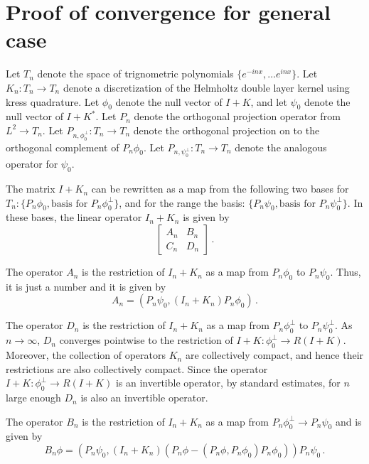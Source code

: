 \section{Proof of convergence for general case}
Let $T_{n}$ denote the space of trignometric polynomials
$\{ e^{-inx}, \ldots e^{inx} \}$. Let $K_{n}: T_{n} \to T_{n}$ 
denote a discretization of the Helmholtz double layer kernel
using kress quadrature. Let $\phi_{0}$ denote the null vector
of $I+ K$, and let $\psi_{0}$ denote the null vector
of $I+K^{\ast}$. 
Let $P_{n}$ denote the orthogonal 
projection operator from $L^{2} \to T_{n}$.
Let $P_{n,\phi_{0}^{\perp}}: T_{n} \to T_{n}$ denote the orthogonal
projection on to the orthogonal complement of $P_{n} \phi_{0}$.
Let $P_{n,\psi_{0}^{\perp}}: T_{n} \to T_{n}$ denote the
analogous operator for $\psi_{0}$. 

The matrix $I+K_{n}$ can be rewritten as a map from the
following two bases for $T_{n}: \{ P_{n} \phi_{0}, \text{basis for }
P_{n}\phi_{0}^{\perp} \}$, and for the range the basis:
$\{ P_{n} \psi_{0}, \text{basis for } P_{n} \psi_{0}^{\perp} \}$.
In these bases, the linear operator $I_{n} + K_{n}$ is given by
\begin{equation}
\begin{bmatrix}
A_{n} & B_{n} \\
C_{n} & D_{n} 
\end{bmatrix} \, .
\end{equation}

The operator $A_{n}$
is the restriction of $I_{n} + K_{n}$ as a map from $P_{n} \phi_{0}$ 
to $P_{n} \psi_{0}$. Thus, it is just a number and it is given by
\begin{equation}
A_{n} = \left(P_{n} \psi_{0}, (I_{n} + K_{n}) P_{n} \phi_{0} \right) \,.
\end{equation}

The operator $D_{n}$ is the restriction of $I_{n} + K_{n}$ 
as a map from $P_{n} \phi_{0}^{\perp}$ 
to $P_{n} \psi_{0}^{\perp}$. 
As $n \to \infty$, $D_{n}$ converges pointwise to the restriction
of $I + K: \phi_{0}^{\perp} \to R(I+K)$. Moreover, the collection
of operators $K_{n}$ are collectively compact, and hence their restrictions
are also collectively compact. 
Since the operator $I+K: \phi_{0}^{\perp} \to R(I+K)$ is an invertible
operator, by standard estimates, for $n$ large enough $D_{n}$ is also 
an invertible operator. 

The operator $B_{n}$ is the restriction of $I_{n} + K_{n}$ as a map from 
$P_{n} \phi_{0} ^{\perp} \to P_{n} \psi_{0}$ and is given by
\begin{equation}
B_{n} \phi = \left( P_{n} \psi_{0}, (I_{n} + K_{n}) 
(P_{n} \phi -( P_{n} \phi, P_{n} \phi_{0}) P_{n} \phi_{0}) \right) P_{n} \psi_{0}  \, .
\end{equation}

